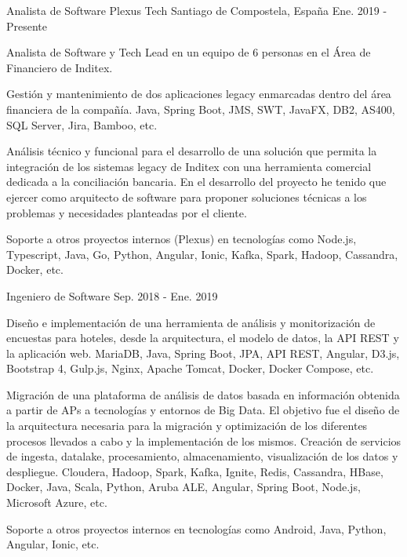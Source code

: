 
\begin{cventries}
  \cventry
    {Analista de Software}
    {Plexus Tech}
    {Santiago de Compostela, España}
    {Ene. 2019 - Presente}
    {
      \begin{cvitems}
        \item {Analista de Software y Tech Lead en un equipo de 6 personas en el Área de Financiero de Inditex.}
        \item {Gestión y mantenimiento de dos aplicaciones legacy enmarcadas dentro del área financiera de la compañía. Java, Spring Boot, JMS, SWT, JavaFX, DB2, AS400, SQL Server, Jira, Bamboo, etc.}
        \item {Análisis técnico y funcional para el desarrollo de una solución que permita la integración de los sistemas legacy de Inditex con una herramienta comercial dedicada a la conciliación bancaria. En el desarrollo del proyecto he tenido que ejercer como arquitecto de software para proponer soluciones técnicas a los problemas y necesidades planteadas por el cliente.}
        \item {Soporte a otros proyectos internos (Plexus) en tecnologías como Node.js, Typescript, Java, Go, Python, Angular, Ionic, Kafka, Spark, Hadoop, Cassandra, Docker, etc.}
      \end{cvitems}
    }

  \cventry
    {Ingeniero de Software}
    {}
    {}
    {Sep. 2018 - Ene. 2019}
    {
      \begin{cvitems}
        \item {Diseño e implementación de una herramienta de análisis y monitorización de encuestas para hoteles, desde la arquitectura, el modelo de datos, la API REST y la aplicación web. MariaDB, Java, Spring Boot, JPA, API REST, Angular, D3.js, Bootstrap 4, Gulp.js, Nginx, Apache Tomcat, Docker, Docker Compose, etc.}
        \item {Migración de una plataforma de análisis de datos basada en información obtenida a partir de APs a tecnologías y entornos de Big Data. El objetivo fue el diseño de la arquitectura necesaria para la migración y optimización de los diferentes procesos llevados a cabo y la implementación de los mismos. Creación de servicios de ingesta, datalake, procesamiento, almacenamiento, visualización de los datos y despliegue. Cloudera, Hadoop, Spark, Kafka, Ignite, Redis, Cassandra, HBase, Docker, Java, Scala, Python, Aruba ALE, Angular, Spring Boot, Node.js, Microsoft Azure, etc.}
        \item {Soporte a otros proyectos internos en tecnologías como Android, Java, Python, Angular, Ionic, etc.}
      \end{cvitems}
    }


\end{cventries}
